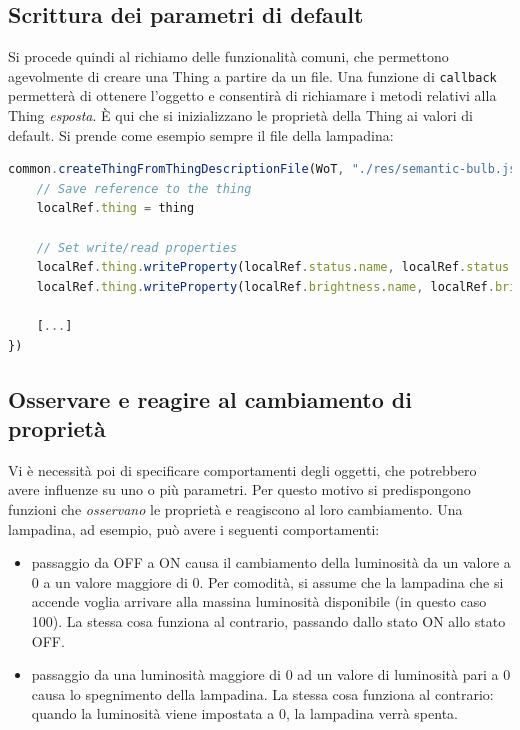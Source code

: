 \documentclass[12pt,a4paper,openright,oneside]{report}
\begin{document}
\subsection{Scrittura dei parametri di default}
Si procede quindi al richiamo delle funzionalità comuni, che permettono agevolmente di creare una Thing a partire da un file. Una funzione di \texttt{callback} permetterà di ottenere l'oggetto e consentirà di richiamare i metodi relativi alla Thing \textit{esposta}. È qui che si inizializzano le proprietà della Thing ai valori di default. Si prende come esempio sempre il file della lampadina:

\begin{lstlisting}[language=JavaScript,caption={Creazione della Thing e inizializzazione proprietà read/write in \texttt{bulb.js}}]
common.createThingFromThingDescriptionFile(WoT, "./res/semantic-bulb.json", function(thing) {
	// Save reference to the thing
	localRef.thing = thing
	
	// Set write/read properties
	localRef.thing.writeProperty(localRef.status.name, localRef.status.value)
	localRef.thing.writeProperty(localRef.brightness.name, localRef.brightness.value)
	
	[...]
})
\end{lstlisting}

\subsection{Osservare e reagire al cambiamento di proprietà}
\label{sec:observe_react}
Vi è necessità poi di specificare comportamenti degli oggetti, che potrebbero avere influenze su uno o più parametri. Per questo motivo si predispongono funzioni che \textit{osservano} le proprietà e reagiscono al loro cambiamento. Una lampadina, ad esempio, può avere i seguenti comportamenti:

\begin{itemize}
	\item passaggio da OFF a ON causa il cambiamento della luminosità da un valore a 0 a un valore maggiore di 0. Per comodità, si assume che la lampadina che si accende voglia arrivare alla massina luminosità disponibile (in questo caso 100). La stessa cosa funziona al contrario, passando dallo stato ON allo stato OFF.
	
	\item passaggio da una luminosità maggiore di 0 ad un valore di luminosità pari a 0 causa lo spegnimento della lampadina. La stessa cosa funziona al contrario: quando la luminosità viene impostata a 0, la lampadina verrà spenta.
\end{itemize}
\end{document}
